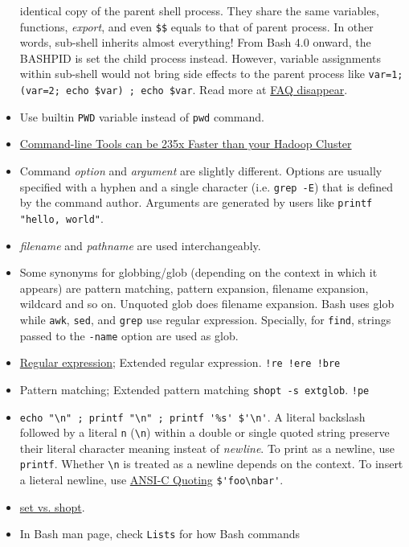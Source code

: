 \begin{itemize}
  identical copy of the parent shell process. They share the same
  variables, functions, \textit{export}, and even
  \lstinline|$$| equals to that of parent process. In other words,
  sub-shell inherits almost everything! From Bash 4.0 onward, the
  BASHPID is set the child process instead. However, variable
  assignments within sub-shell would not bring side effects to the
  parent process like
  \lstinline|var=1; (var=2; echo $var) ; echo $var|. Read more at
  \href{http://mywiki.wooledge.org/BashFAQ/024}{FAQ disappear}.
\item Use builtin \lstinline|PWD| variable instead of
  \lstinline|pwd| command.
\item
  \href{https://adamdrake.com/command-line-tools-can-be-235x-faster-than-your-hadoop-cluster.html}{Command-line
    Tools can be 235x Faster than your Hadoop Cluster}
\item Command \textit{option} and \textit{argument} are slightly
  different. Options are usually specified with a hyphen and a
  single character (i.e. \lstinline|grep -E|) that is defined by
  the command author. Arguments are generated by users like
  \lstinline|printf "hello, world"|.
\item \textit{filename} and \textit{pathname} are used
  interchangeably.
\item Some synonyms for globbing/glob (depending on the context in
  which it appears) are pattern matching, pattern expansion,
  filename expansion, wildcard and so on. Unquoted glob does
  filename expansion. Bash uses glob while \lstinline|awk|,
  \lstinline|sed|, and \lstinline|grep| use regular
  expression. Specially, for \lstinline|find|, strings passed to
  the \lstinline|-name| option are used as glob.
\item
  \href{https://www.regular-expressions.info/tutorial.html}{Regular
    expression}; Extended regular expression. \verb|!re !ere !bre|
\item Pattern matching; Extended pattern matching
  \lstinline|shopt -s extglob|. \verb|!pe|
\item \lstinline|echo "\n" ; printf "\n" ; printf '%s' $'\n'|. A
  literal backslash followed by a literal \verb|n|
  (\lstinline|\n|) within a double or single quoted string
  preserve their literal character meaning insteat of
  \textit{newline}. To print as a newline, use
  \lstinline|printf|. Whether \verb|\n| is treated as a newline
  depends on the context. To insert a lieteral newline, use
  \href{https://www.gnu.org/software/bash/manual/bash.html#ANSI_002dC-Quoting}{ANSI-C
    Quoting} \lstinline|$'foo\nbar'|.
\item \href{https://unix.stackexchange.com/q/32409}{set
    vs. shopt}.
\item In Bash man page, check \verb|Lists| for how Bash commands 
\end{itemize}

